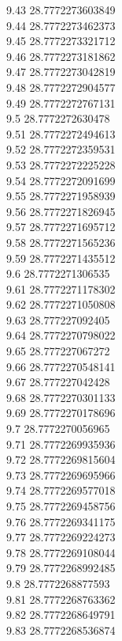 {9.43	28.7772273603849\\
9.44	28.7772273462373\\
9.45	28.7772273321712\\
9.46	28.7772273181862\\
9.47	28.7772273042819\\
9.48	28.7772272904577\\
9.49	28.7772272767131\\
9.5	28.7772272630478\\
9.51	28.7772272494613\\
9.52	28.7772272359531\\
9.53	28.7772272225228\\
9.54	28.7772272091699\\
9.55	28.7772271958939\\
9.56	28.7772271826945\\
9.57	28.7772271695712\\
9.58	28.7772271565236\\
9.59	28.7772271435512\\
9.6	28.7772271306535\\
9.61	28.7772271178302\\
9.62	28.7772271050808\\
9.63	28.777227092405\\
9.64	28.7772270798022\\
9.65	28.777227067272\\
9.66	28.7772270548141\\
9.67	28.777227042428\\
9.68	28.7772270301133\\
9.69	28.7772270178696\\
9.7	28.7772270056965\\
9.71	28.7772269935936\\
9.72	28.7772269815604\\
9.73	28.7772269695966\\
9.74	28.7772269577018\\
9.75	28.7772269458756\\
9.76	28.7772269341175\\
9.77	28.7772269224273\\
9.78	28.7772269108044\\
9.79	28.7772268992485\\
9.8	28.7772268877593\\
9.81	28.7772268763362\\
9.82	28.7772268649791\\
9.83	28.7772268536874\\
}
